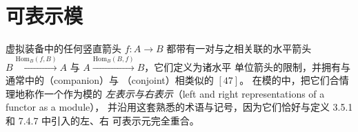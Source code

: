 \providecommand{\Mod}{\mathbb{M}od}
\providecommand{\HomA}{\mathrm{Hom}_{A}}
\providecommand{\HomB}{\mathrm{Hom}_{B}}
\providecommand{\HomC}{\mathrm{Hom}_{C}}
\providecommand{\HomD}{\mathrm{Hom}_{D}}
\providecommand{\HomE}{\mathrm{Hom}_{E}}
\providecommand{\rvbendL}{\tikz[baseline=-0.5ex,x=0.9em,y=0.9em]%
\draw[->] (0.8,0.7) .. controls (-0.6,0.7) and (-0.6,-0.7) .. (0.8,-0.7);}
\providecommand{\rvbendR}{\tikz[baseline=-0.5ex,x=0.9em,y=0.9em]%
\draw[->] (-0.8,-0.7) .. controls (0.6,-0.7) and (0.6,0.7) .. (-0.8,0.7);}

\section{可表示模}\label{sec:representable-modules}

虚拟装备中的任何竖直箭头 $f\colon A\to B$ 都带有一对与之相关联的水平箭头
$B\xrightarrow{\HomB(f,B)}A$ 与 $A\xrightarrow{\HomB(B,f)}B$，它们定义为诸水平
单位箭头的限制，并拥有与通常\trDoubleCategory{}中的\emph{\trCompanion}（companion）与%
\emph{\trConjoint}（conjoint）相类似的\trUniversalProperty{} $[47]$。
在模的\trVirtualEquipment{}中，把它们合情理地称作一个\trFunctor{}作为模的%
\emph{左表示与右表示}（left and right representations of a functor as a module），
并沿用这套熟悉的术语与记号，因为它们恰好与定义 3.5.1 和 7.4.7 中引入的左、右
可表示元完全重合。

